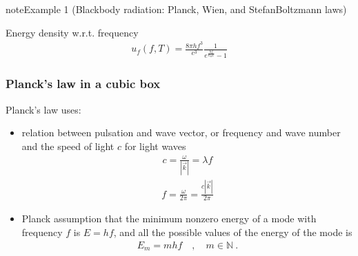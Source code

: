 \documentclass[letterpaper,10pt,english]{jupyterBook}
\begin{document}
\begin{sphinxadmonition}{note}{Example 1 (Black\sphinxhyphen{}body radiation: Planck, Wien, and Stefan\sphinxhyphen{}Boltzmann laws)}



\sphinxAtStartPar
{} Energy density w.r.t. frequency
\begin{equation*}
\begin{split}u_{f}(f, T) = \frac{8 \pi h f^3}{c^3} \frac{1}{e^{\frac{hf}{k_B T}} - 1}\end{split}
\end{equation*}\subsubsection*{Planck’s law in a cubic box}

\sphinxAtStartPar
Planck’s law uses:
\begin{itemize}
\item {} 
\sphinxAtStartPar
relation between pulsation and wave vector, or frequency and wave number and the speed of light \(c\) for light waves
\begin{equation*}
\begin{split}c = \frac{\omega}{|\vec{k}|} = \lambda f\end{split}
\end{equation*}\begin{equation*}
\begin{split}f = \frac{\omega}{2\pi} = \frac{c |\vec{k}|}{2 \pi}\end{split}
\end{equation*}
\item {} 
\sphinxAtStartPar
Planck assumption that the minimum non\sphinxhyphen{}zero energy of a mode with frequency \(f\) is \(E = h f\), and all the possible values of the energy of the mode is
\begin{equation*}
\begin{split}E_m = m h f \quad , \quad m \in \mathbb{N} \ .\end{split}
\end{equation*}
\end{itemize}


\end{sphinxadmonition}
\end{document}

